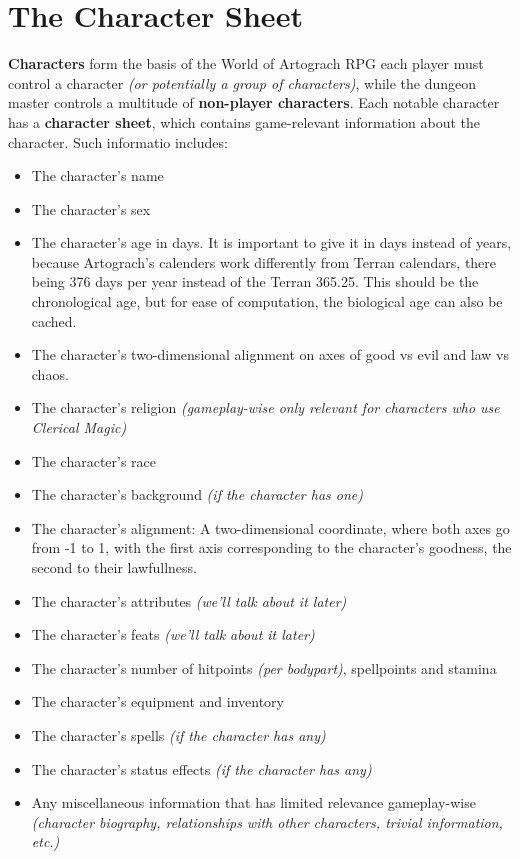 \documentclass[tikz,openany,11pt,a4paper]{book}
\begin{document}
\chapter{The Character Sheet}
\textbf{Characters} form the basis of the World of Artograch RPG \textemdash each player must control a character \textit{(or potentially a group of characters)}, while the dungeon master controls a multitude of \textbf{non-player characters}. Each notable character has a \textbf{character sheet}, which contains game-relevant information about the character. Such informatio includes:
\begin{itemize}
\item The character's name
\item The character's sex
\item The character's age in days. It is important to give it in days instead of years, because Artograch's calenders work differently from Terran calendars, there being 376 days per year instead of the Terran 365.25. This should be the chronological age, but for ease of computation, the biological age can also be cached.
\item The character's two-dimensional alignment on axes of good vs evil and law vs chaos.
\item The character's religion \textit{(gameplay-wise only relevant for characters who use Clerical Magic)}
\item The character's race
\item The character's background \textit{(if the character has one)}
\item The character's alignment: A two-dimensional coordinate, where both axes go from -1 to 1, with the first axis corresponding to the character's goodness, the second to their lawfullness.
\item The character's attributes \textit{(we'll talk about it later)}
\item The character's feats \textit{(we'll talk about it later)}
\item The character's number of hitpoints \textit{(per bodypart)}, spellpoints and stamina
\item The character's equipment and inventory
\item The character's spells \textit{(if the character has any)}
\item The character's status effects \textit{(if the character has any)}
\item Any miscellaneous information that has limited relevance gameplay-wise \textit{(character biography, relationships with other characters, trivial information, etc.)}
\end{itemize}
\pagebreak
\end{document}

